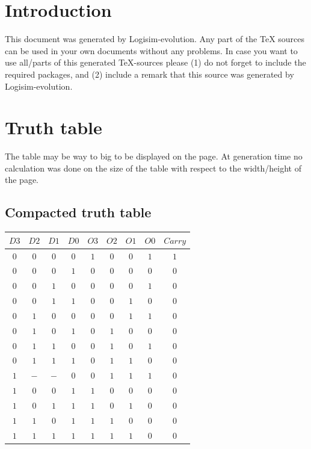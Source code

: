 \documentclass [15pt,a4paper,twoside]{article}
\begin{document}
\section{Introduction}
This document was generated by Logisim-evolution. Any part of the TeX sources can be used in your own documents without any problems. In case you want to use all/parts of this generated TeX-sources please (1) do not forget to include the required packages, and (2) include a remark that this source was generated by Logisim-evolution.
\section{Truth table}
The table may be way to big to be displayed on the page. At generation time no calculation was done on the size of the table with respect to the width/height of the page.
\subsection{Compacted truth table}
\begin{center}
\begin{tabular}{cccc|ccccc}
$D3$&$D2$&$D1$&$D0$&$O3$&$O2$&$O1$&$O0$&$Carry$\\
\hline
$0$&$0$&$0$&$0$&$1$&$0$&$0$&$1$&$1$\\
$0$&$0$&$0$&$1$&$0$&$0$&$0$&$0$&$0$\\
$0$&$0$&$1$&$0$&$0$&$0$&$0$&$1$&$0$\\
$0$&$0$&$1$&$1$&$0$&$0$&$1$&$0$&$0$\\
$0$&$1$&$0$&$0$&$0$&$0$&$1$&$1$&$0$\\
$0$&$1$&$0$&$1$&$0$&$1$&$0$&$0$&$0$\\
$0$&$1$&$1$&$0$&$0$&$1$&$0$&$1$&$0$\\
$0$&$1$&$1$&$1$&$0$&$1$&$1$&$0$&$0$\\
$1$&$-$&$-$&$0$&$0$&$1$&$1$&$1$&$0$\\
$1$&$0$&$0$&$1$&$1$&$0$&$0$&$0$&$0$\\
$1$&$0$&$1$&$1$&$1$&$0$&$1$&$0$&$0$\\
$1$&$1$&$0$&$1$&$1$&$1$&$0$&$0$&$0$\\
$1$&$1$&$1$&$1$&$1$&$1$&$1$&$0$&$0$\\

\end{tabular}
\end{center}
\end{document}
